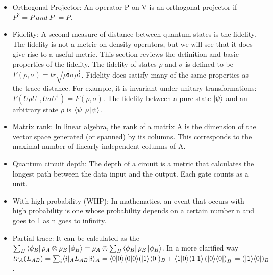 \documentclass{article}
\begin{document}
\begin{itemize}
        \item Orthogonal Projector: An operator P on V is an orthogonal projector if $P^{2} = P\ and\ P^\dag = P$. \cite{portugal}

        \item Fidelity: A second measure of distance between quantum states is the ﬁdelity. The ﬁdelity is not a metric on density operators, but we will see that it does give rise to a useful metric. This  section reviews the deﬁnition and basic properties of the ﬁdelity. The ﬁdelity of states $\rho$ and $\sigma$ is deﬁned to be $F(\rho,\sigma) = tr \sqrt{\rho^{\frac{1}{2}} \sigma \rho^{\frac{1}{2}}}$. Fidelity does satisfy many of the same properties as the trace distance. For example, it is invariant under unitary transformations: $F(U\rho U^{\dag}, U\sigma U^{\dag}) = F(\rho,\sigma)$. The ﬁdelity between a pure state $\ket{\psi}$ and an arbitrary state $\rho$ is $\bra{\psi}\rho\ket{\psi}$.\cite{quantccompquantinfo}

        \item Matrix rank: In linear algebra, the rank of a matrix A is the dimension of the vector space generated (or spanned) by its columns. This corresponds to the maximal number of linearly independent columns of A.  %

        \item Quantum circuit depth: The depth of a circuit is a metric that calculates the longest path between the data input and the output. Each gate counts as a unit.  %

        \item With high probability (WHP): In mathematics, an event that occurs with high probability is one whose probability depends on a certain number n and goes to 1 as n goes to infinity. %

        \item Partial trace: It can be calculated as the $\sum_B \bra{\phi_B} \rho_A \otimes \rho_B \ket{\phi_B} = \rho_A \otimes \sum_B \bra{\phi_B} \rho_B \ket{\phi_B}$. In a more clarified way $tr_A(L_{AB}) =\sum_i \langle i|_A L_{AB} |i\rangle_A=\langle0|0\rangle\langle 0|0\rangle (|1\rangle\langle0|)_B+\langle1|0\rangle\langle 1|1\rangle \left(|0\rangle\langle0|\right)_B\\ =(|1\rangle\langle0|)_B$ . 

    \end{itemize}
\end{document}
